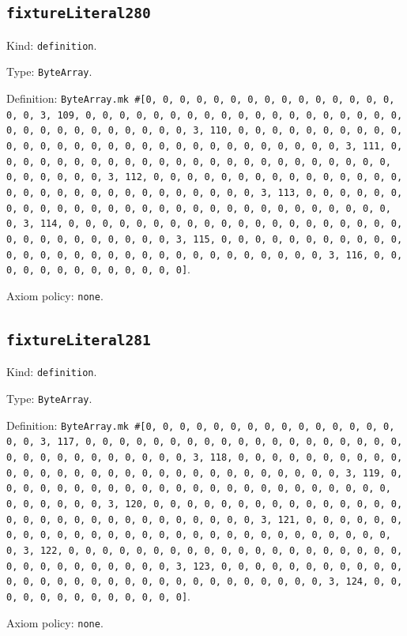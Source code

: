 \documentclass[11pt]{article}
\begin{document}
\subsection*{\texttt{fixtureLiteral280}}
\noindent Kind: \texttt{definition}.\par
\noindent Type: \texttt{ByteArray}.\par
\noindent Definition: \texttt{ByteArray.mk \#[0, 0, 0, 0, 0, 0, 0, 0, 0, 0, 0, 0, 0, 0, 0, 0, 0, 3, 109, 0, 0, 0, 0, 0, 0, 0, 0, 0, 0, 0, 0, 0, 0, 0, 0, 0, 0, 0, 0, 0, 0, 0, 0, 0, 0, 0, 0, 0, 0, 3, 110, 0, 0, 0, 0, 0, 0, 0, 0, 0, 0, 0, 0, 0, 0, 0, 0, 0, 0, 0, 0, 0, 0, 0, 0, 0, 0, 0, 0, 0, 0, 3, 111, 0, 0, 0, 0, 0, 0, 0, 0, 0, 0, 0, 0, 0, 0, 0, 0, 0, 0, 0, 0, 0, 0, 0, 0, 0, 0, 0, 0, 0, 0, 3, 112, 0, 0, 0, 0, 0, 0, 0, 0, 0, 0, 0, 0, 0, 0, 0, 0, 0, 0, 0, 0, 0, 0, 0, 0, 0, 0, 0, 0, 0, 0, 3, 113, 0, 0, 0, 0, 0, 0, 0, 0, 0, 0, 0, 0, 0, 0, 0, 0, 0, 0, 0, 0, 0, 0, 0, 0, 0, 0, 0, 0, 0, 0, 3, 114, 0, 0, 0, 0, 0, 0, 0, 0, 0, 0, 0, 0, 0, 0, 0, 0, 0, 0, 0, 0, 0, 0, 0, 0, 0, 0, 0, 0, 0, 0, 3, 115, 0, 0, 0, 0, 0, 0, 0, 0, 0, 0, 0, 0, 0, 0, 0, 0, 0, 0, 0, 0, 0, 0, 0, 0, 0, 0, 0, 0, 0, 0, 3, 116, 0, 0, 0, 0, 0, 0, 0, 0, 0, 0, 0, 0, 0]}.\par
\noindent Axiom policy: \texttt{none}.\par
\subsection*{\texttt{fixtureLiteral281}}
\noindent Kind: \texttt{definition}.\par
\noindent Type: \texttt{ByteArray}.\par
\noindent Definition: \texttt{ByteArray.mk \#[0, 0, 0, 0, 0, 0, 0, 0, 0, 0, 0, 0, 0, 0, 0, 0, 0, 3, 117, 0, 0, 0, 0, 0, 0, 0, 0, 0, 0, 0, 0, 0, 0, 0, 0, 0, 0, 0, 0, 0, 0, 0, 0, 0, 0, 0, 0, 0, 0, 3, 118, 0, 0, 0, 0, 0, 0, 0, 0, 0, 0, 0, 0, 0, 0, 0, 0, 0, 0, 0, 0, 0, 0, 0, 0, 0, 0, 0, 0, 0, 0, 3, 119, 0, 0, 0, 0, 0, 0, 0, 0, 0, 0, 0, 0, 0, 0, 0, 0, 0, 0, 0, 0, 0, 0, 0, 0, 0, 0, 0, 0, 0, 0, 3, 120, 0, 0, 0, 0, 0, 0, 0, 0, 0, 0, 0, 0, 0, 0, 0, 0, 0, 0, 0, 0, 0, 0, 0, 0, 0, 0, 0, 0, 0, 0, 3, 121, 0, 0, 0, 0, 0, 0, 0, 0, 0, 0, 0, 0, 0, 0, 0, 0, 0, 0, 0, 0, 0, 0, 0, 0, 0, 0, 0, 0, 0, 0, 3, 122, 0, 0, 0, 0, 0, 0, 0, 0, 0, 0, 0, 0, 0, 0, 0, 0, 0, 0, 0, 0, 0, 0, 0, 0, 0, 0, 0, 0, 0, 0, 3, 123, 0, 0, 0, 0, 0, 0, 0, 0, 0, 0, 0, 0, 0, 0, 0, 0, 0, 0, 0, 0, 0, 0, 0, 0, 0, 0, 0, 0, 0, 0, 3, 124, 0, 0, 0, 0, 0, 0, 0, 0, 0, 0, 0, 0, 0]}.\par
\noindent Axiom policy: \texttt{none}.\par
\end{document}
